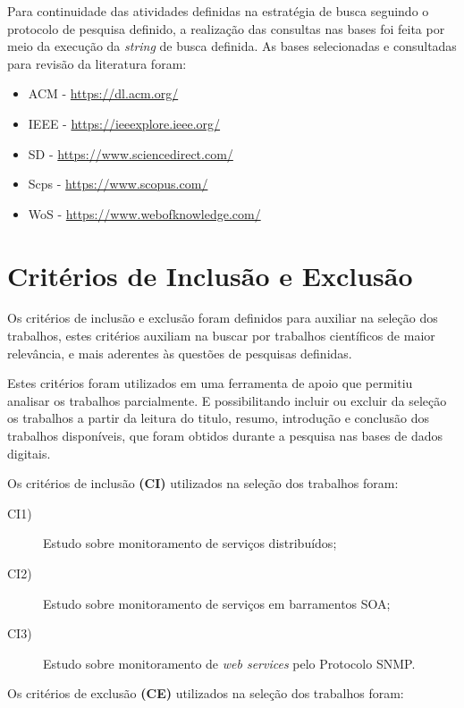 Para continuidade das atividades definidas na estratégia de busca seguindo o protocolo de pesquisa definido, a realização das consultas nas bases foi feita por meio da execução da \textit{string} de busca definida. As bases selecionadas e consultadas para revisão da literatura foram:
\begin{itemize}
\item \acrlong{ACM} - \url{https://dl.acm.org/}
\item \acrlong{IEEE} - \url{https://ieeexplore.ieee.org/}
\item \acrlong{SD} - \url{https://www.sciencedirect.com/}
\item \acrlong{Scps} - \url{https://www.scopus.com/}
\item \acrlong{WoS} - \url{https://www.webofknowledge.com/}
\end{itemize}


\section{Critérios de Inclusão e Exclusão}
\label{sec:cIncExc}
Os critérios de inclusão e exclusão foram definidos para auxiliar na seleção dos trabalhos, estes critérios auxiliam na buscar por trabalhos científicos de maior relevância, e mais aderentes às questões de pesquisas definidas. 

Estes critérios foram utilizados em uma ferramenta de apoio que permitiu analisar os trabalhos parcialmente. E possibilitando incluir ou excluir da seleção os trabalhos a partir da leitura do titulo, resumo, introdução e conclusão dos trabalhos disponíveis, que foram obtidos durante a pesquisa nas bases de dados digitais.    

Os critérios de inclusão \textbf{(CI)} utilizados na seleção dos trabalhos foram:

\begin{description}

\item[CI1)] Estudo sobre monitoramento de serviços distribuídos;
\item[CI2)] Estudo sobre monitoramento de serviços em barramentos \acrshort{SOA};
\item[CI3)] Estudo sobre monitoramento de \textit{web services} pelo Protocolo \acrshort{SNMP}.
\end{description}

Os critérios de exclusão \textbf{(CE)} utilizados na seleção dos trabalhos foram:


